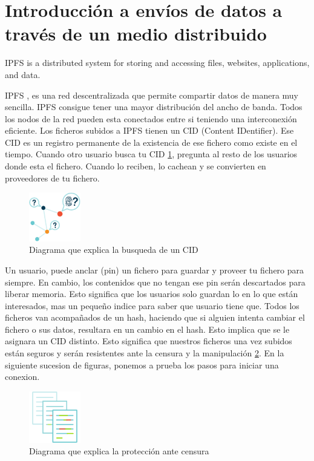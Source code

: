 \section{Introducción a envíos de datos a través de un medio distribuido}
\begin{displayquote}
    IPFS \cite{web:ipfs} is a distributed system for storing and accessing files, websites, applications, and data. \cite{web:ipfs_whatis}
\end{displayquote}
IPFS \cite{web:ipfs}, es una red descentralizada que permite compartir datos de manera muy sencilla. IPFS \cite{web:ipfs} consigue tener una mayor distribución del ancho de banda.
Todos los nodos de la red pueden esta conectados entre si teniendo una interconexión eficiente. Los ficheros subidos a IPFS \cite{web:ipfs} tienen un CID (Content IDentifier). Ese CID es un registro permanente de la existencia de ese fichero como existe en el tiempo.
Cuando otro usuario busca tu CID \ref{fg:looking_for_CID}, pregunta al resto de los usuarios donde esta el fichero. Cuando lo reciben, lo cachean y se convierten en proveedores de tu fichero.
\begin{figure}[h!]
    \centering
    \includegraphics[width=0.2\textwidth]{Figures/svgviewer-png-output.png}
    \caption{Diagrama que explica la busqueda de un CID}
    \label{fg:looking_for_CID}
\end{figure}
Un usuario, puede anclar (pin) un fichero para guardar y proveer tu fichero para siempre. En cambio, los contenidos que no tengan ese pin serán descartados para liberar memoria. Esto significa que los usuarios solo guardan lo en lo que están interesados, mas un pequeño indice para saber que usuario tiene que.
Todos los ficheros van acompañados de un hash, haciendo que si alguien intenta cambiar el fichero o sus datos, resultara en un cambio en el hash. Esto implica que se le asignara un CID distinto. Esto significa que nuestros ficheros una vez subidos están seguros y serán resistentes ante la censura y la manipulación \ref{fg:keeping_IPFS_safe}.
En la siguiente sucesion de figuras, ponemos a prueba los pasos para iniciar una conexion.
\begin{center}
\begin{figure}[h!]
    \centering
    \includegraphics[width=0.2\textwidth]{Figures/svgviewer-png-output(2).png}
    \caption{Diagrama que explica la protección ante censura}
    \label{fg:keeping_IPFS_safe}
\end{figure}
\end{center}
